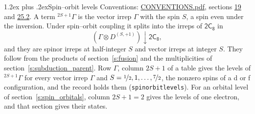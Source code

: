 \documentclass[10pt,a4paper]{article}
\makeatletter
\renewcommand\section{\@startsection{section}{1}{\z@}{-3ex plus -1ex minus -.2ex}%
  {1.2ex plus .2ex}{\normalfont\large\sffamily\bfseries\color{parttitle}}}
\numberwithin{equation}{section}
\newcommand{\grp}[1]{\mathsf{#1}}
\newcommand{\restr}[2]{#1\!\downarrow#2}
\newcommand{\irrJp}[2]{D^{(#1,#2)}}
\newcommand{\irrprod}{\otimes}
\newcommand{\term}[2]{{}^{#1}#2}
\makeatother
\begin{document}
\section{Spin--orbit levels}\label{s:spin_orbit}
Conventions: \href{../../CONVENTIONS.pdf}{CONVENTIONS.pdf}, sections \href{../../../rotation/CONVENTIONS.pdf\#conv.19}{19} and \href{../../CONVENTIONS.pdf\#conv.25.2}{25.2}.
\leavevmode\label{n:local.spin}\label{n:symbol.term}A term $\term{2S+1}{\Gamma}$ is the vector irrep $\Gamma$ with the spin $S$, a spin even under the inversion. Under spin--orbit coupling it splits into the irreps of $\grp{2C_{8}}$ in
\begin{equation}\label{e:spinorbit}\restr{(\Gamma \irrprod \irrJp{S}{+1})}{\grp{2C_{8}}},\end{equation}
and they are spinor irreps at half-integer $S$ and vector irreps at integer $S$. They follow from the products of section~\ref{s:fusion} and the multiplicities of section~\ref{s:subduction_parent}. Row $\Gamma$, column $2S + 1$ of a table gives the levels of $\term{2S+1}{\Gamma}$ for every vector irrep $\Gamma$ and $S = \nicefrac{1}{2}, 1, \dots, \nicefrac{7}{2}$, the nonzero spins of a d or f configuration, and the record holds them (\texttt{spinorbitlevels}). For an orbital level of section~\ref{s:spin_orbitals}, column $2S + 1 = 2$ gives the levels of one electron, and that section gives their states.
\end{document}
